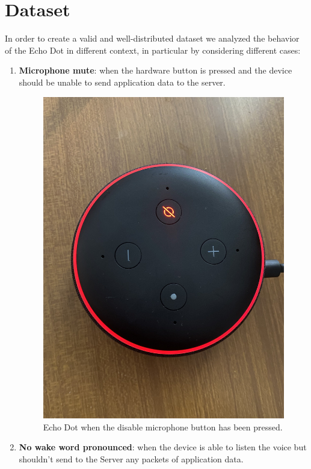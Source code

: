 \documentclass[sigconf]{acmart}
\begin{document}
    \section{Dataset}
    In order to create a valid and well-distributed dataset we analyzed the behavior of the Echo Dot in different context, in particular by considering different cases:
    \begin{enumerate}
        \item \textbf{Microphone mute}: when the hardware button is pressed and the device should be unable to send application data to the server.
        \begin{figure}[h!]
            \includegraphics[width=\linewidth]{img/alexa_red.jpg}
            \caption{Echo Dot when the disable microphone button has been pressed.}
            \label{fig:Alexa_red_led}
        \end{figure}
        \item \textbf{No wake word pronounced}: when the device is able to listen the voice but shouldn't send to the Server any packets of application data.

\end{enumerate}
\end{document}
